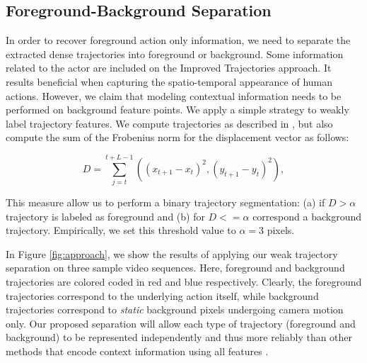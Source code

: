 



\subsection{Foreground-Background Separation}
In order to recover foreground action only information, we need to separate the extracted dense trajectories into foreground or background. Some information related to the actor are included on the Improved Trajectories approach. It results beneficial when capturing the spatio-temporal appearance of human actions. However, we claim that modeling contextual information needs to be performed on background feature points.  We apply a simple strategy to weakly label trajectory features. We compute trajectories as described in \cite{wang2013}, but also compute the sum of the Frobenius norm for the displacement vector as follows:

\begin{equation}
D = \sum _{j=t}^{t+L-1}\left ( (x_{t+1}-x_t)^2, (y_{t+1}-y_t)^2 \right ),
\end{equation}

This measure allow us to perform a binary trajectory segmentation: (a) if $D>\alpha$ trajectory is labeled as foreground and (b) for $D<=\alpha$ correspond a background trajectory. Empirically, we set this threshold value to $\alpha=3$ pixels. 

In Figure \ref{fig:approach}, we show the results of applying our weak trajectory separation on three sample video sequences. Here, foreground and background trajectories are colored coded in red and blue respectively. Clearly, the foreground trajectories correspond to the underlying action itself, while background trajectories correspond to \emph{static} background pixels undergoing camera motion only. Our proposed separation will allow each type of trajectory (foreground and background) to be represented independently and thus more reliably than other methods that encode context information using all features \cite{marszalek2009}.


